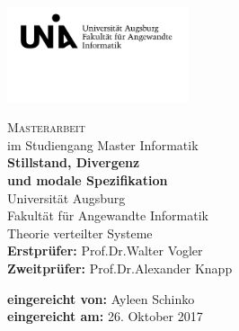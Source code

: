 \begin{titlepage}
\includegraphics[width=0.4\textwidth]{Uni_Aug_Logo_FAI_schwarz.png}
\vspace{-1cm}
\begin{center}
  \LARGE \textsc{Masterarbeit}\\
  \normalsize im Studiengang Master Informatik\\
  \vfill
  \Huge \textbf{Stillstand, Divergenz\\
  und modale Spezifikation}\\
  \vfill
  \Large Universität Augsburg\\
  Fakultät für Angewandte Informatik\\
  Theorie verteilter Systeme\\
  \vspace{1.5cm}
  \rmfamily \large \textbf{Erstprüfer:} Prof.\;Dr.\;Walter Vogler\\
  \rmfamily \large \textbf{Zweitprüfer:} Prof.\;Dr.\;Alexander Knapp
\end{center}
\vspace{1cm}
\large \textbf{eingereicht von:}
Ayleen Schinko\\
\textbf{eingereicht am:}
26. Oktober 2017 %
\end{titlepage}
